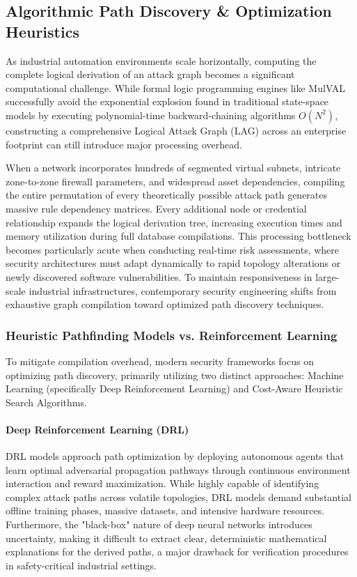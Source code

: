 \documentclass[target=mst,aauheader=aics,style=]{thud}
\begin{document}
\subsection{Algorithmic Path Discovery \& Optimization Heuristics}
As industrial automation environments scale horizontally, computing the complete logical derivation of an attack graph becomes a significant computational challenge. While formal logic programming engines like MulVAL successfully avoid the exponential explosion found in traditional state-space models by executing polynomial-time backward-chaining algorithms $O(N^2)$, constructing a comprehensive Logical Attack Graph (LAG) across an enterprise footprint can still introduce major processing overhead. 

When a network incorporates hundreds of segmented virtual subnets, intricate zone-to-zone firewall parameters, and widespread asset dependencies, compiling the entire permutation of every theoretically possible attack path generates massive rule dependency matrices. Every additional node or credential relationship expands the logical derivation tree, increasing execution times and memory utilization during full database compilations. This processing bottleneck becomes particularly acute when conducting real-time risk assessments, where security architectures must adapt dynamically to rapid topology alterations or newly discovered software vulnerabilities. To maintain responsiveness in large-scale industrial infrastructures, contemporary security engineering shifts from exhaustive graph compilation toward optimized path discovery techniques.

\subsubsection{Heuristic Pathfinding Models vs. Reinforcement Learning}
To mitigate compilation overhead, modern security frameworks focus on optimizing path discovery, primarily utilizing two distinct approaches: Machine Learning (specifically Deep Reinforcement Learning) and Cost-Aware Heuristic Search Algorithms. 

\paragraph{Deep Reinforcement Learning (DRL)}
DRL models approach path optimization by deploying autonomous agents that learn optimal adversarial propagation pathways through continuous environment interaction and reward maximization. While highly capable of identifying complex attack paths across volatile topologies, DRL models demand substantial offline training phases, massive datasets, and intensive hardware resources. Furthermore, the "black-box" nature of deep neural networks introduces uncertainty, making it difficult to extract clear, deterministic mathematical explanations for the derived paths, a major drawback for verification procedures in safety-critical industrial settings. 
\end{document}
